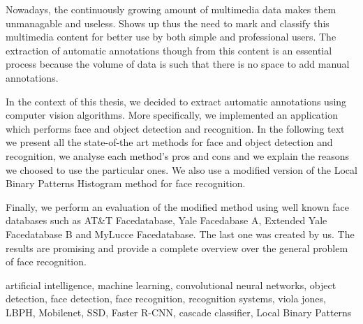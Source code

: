 \begin{abstracteng}

Nowadays, the continuously growing amount of multimedia data makes them unmanagable
and useless. Shows up thus the need to mark and classify this multimedia content
for better use by both simple and professional users. The extraction of automatic
annotations though from this content is an essential process because the volume of data
is such that there is no space to add manual annotations.

In the context of this thesis, we decided to extract automatic annotations using
computer vision algorithms. More specifically, we implemented an application which
performs face and object detection and recognition. In the following text we present
all the state-of-the art methods for face and object detection and recognition, we
analyse each method's pros and cons and we explain the reasons we choosed to use
the particular ones. We also use a modified version of the Local Binary Patterns Histogram
method for face recognition.

Finally, we perform an evaluation of the modified method using well known face databases
such as AT\&T Facedatabase, Yale Facedabase A, Extended Yale Facedatabase B and
MyLucce Facedatabase. The last one was created by us. The results are promising
and provide a complete overview over the general problem of face recognition.

\begin{keywordseng}
artificial intelligence, machine learning, convolutional neural
networks, object detection, face detection, face recognition, recognition
systems, viola jones, LBPH, Mobilenet, SSD, Faster R-CNN, cascade classifier,
Local Binary Patterns
\end{keywordseng}

\end{abstracteng}

